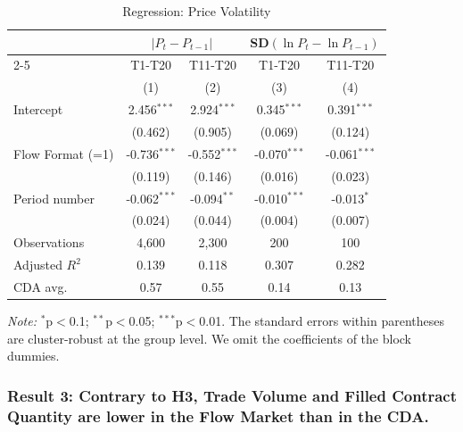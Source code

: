 \begin{table}[H]
\centering    
\caption{Regression: Price Volatility}
\begin{threeparttable}
\begin{tabular}{@{\extracolsep{5pt}}lcccc}
\toprule
& \multicolumn{2}{c}{$\lvert P_{t} - P_{t - 1}\rvert$} & \multicolumn{2}{c}{SD$\left(\ln P_{t} - \ln P_{t - 1}\right)$} \\
\cmidrule{2-5}
& T1-T20 & T11-T20 & T1-T20 & T11-T20 \\
& (1) & (2) & (3) & (4) \\
\midrule
Intercept & 2.456$^{***}$ & 2.924$^{***}$ & 0.345$^{***}$ & 0.391$^{***}$ \\
 & (0.462) & (0.905) & (0.069) & (0.124) \\
Flow Format (=1) & -0.736$^{***}$ & -0.552$^{***}$ & -0.070$^{***}$ & -0.061$^{***}$ \\
 & (0.119) & (0.146) & (0.016) & (0.023) \\
Period number & -0.062$^{***}$ & -0.094$^{**}$ & -0.010$^{***}$ & -0.013$^{*}$ \\
 & (0.024) & (0.044) & (0.004) & (0.007) \\
\midrule
Observations & 4,600 & 2,300 & 200 & 100 \\
Adjusted $R^2$ & 0.139 & 0.118 & 0.307 & 0.282 \\
\midrule
CDA avg. & 0.57 & 0.55 & 0.14 & 0.13 \\
\bottomrule
\end{tabular}
\begin{tablenotes}
\footnotesize
\textit{Note:} $^{*}$p$<$0.1; $^{**}$p$<$0.05; $^{***}$p$<$0.01. The standard errors within parentheses are cluster-robust at the group level. We omit the coefficients of the block dummies. 
\end{tablenotes}
\end{threeparttable}
\label{tab:PriceVolatility}
\end{table}

\subsubsection*{Result 3: Contrary to H3, Trade Volume and Filled Contract Quantity are lower in the Flow Market than in the CDA.}

